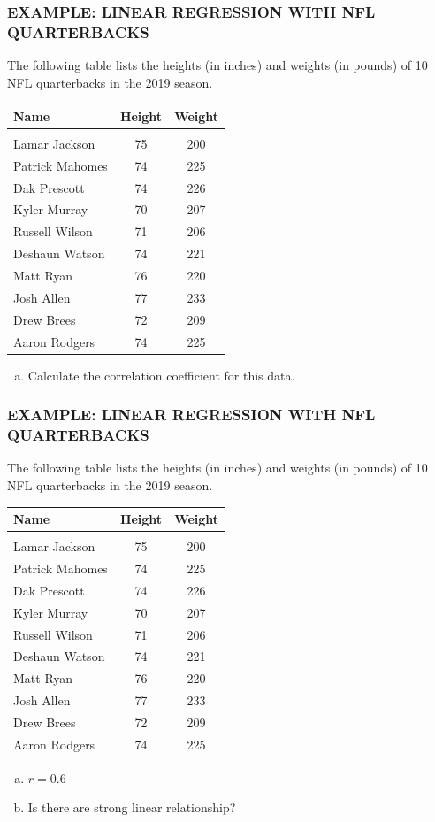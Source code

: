 \documentclass[8pt]{beamer}
\newcommand{\extitle}[1]{\frametitle{\fontfamily{fvs}\selectfont \small\color{black!70!blue!80!cyan}\uppercase{\bfseries Example: #1}}}
\def\solblank{\begin{tcolorbox}[colframe=black!50!blue!50!cyan,
colback=white,
bottomrule=0mm,
rightrule=0mm,
sharp corners=all] 
\vspace{6in}
\text{}
\end{tcolorbox}}
\begin{document}
\begin{frame}
\extitle{Linear Regression with NFL Quarterbacks}
The following table lists the heights (in inches) and weights (in pounds) of 10 NFL quarterbacks in the 2019 season.
{\footnotesize\begin{center}
\begin{tabular}{l c c}
\textbf{Name} & \textbf{Height} & \textbf{Weight}\\
\hline
& & \\
Lamar Jackson & 75 & 200\\
Patrick Mahomes & 74 & 225\\
Dak Prescott & 74 & 226\\
Kyler Murray & 70 & 207\\
Russell Wilson & 71 & 206\\
Deshaun Watson & 74 & 221\\
Matt Ryan & 76 & 220\\
Josh Allen & 77 & 233\\
Drew Brees & 72 & 209\\
Aaron Rodgers & 74 & 225\\
\end{tabular}
\end{center}}
\begin{enumerate}[(a)]
\item Calculate the correlation coefficient for this data.
\end{enumerate}

\solblank
\end{frame}

\begin{frame}
\extitle{Linear Regression with NFL Quarterbacks}
The following table lists the heights (in inches) and weights (in pounds) of 10 NFL quarterbacks in the 2019 season.
{\footnotesize\begin{center}
\begin{tabular}{l c c}
\textbf{Name} & \textbf{Height} & \textbf{Weight}\\
\hline
& & \\
Lamar Jackson & 75 & 200\\
Patrick Mahomes & 74 & 225\\
Dak Prescott & 74 & 226\\
Kyler Murray & 70 & 207\\
Russell Wilson & 71 & 206\\
Deshaun Watson & 74 & 221\\
Matt Ryan & 76 & 220\\
Josh Allen & 77 & 233\\
Drew Brees & 72 & 209\\
Aaron Rodgers & 74 & 225\\
\end{tabular}
\end{center}}
\begin{enumerate}[(a)]
\item $r = 0.6$
\item Is there are strong linear relationship?
\end{enumerate}

\solblank
\end{frame}
\end{document}
